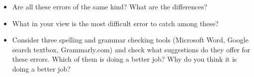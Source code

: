 \documentclass[11pt,a4paper]{article}
\begin{document}
\begin{itemize}
\item Are all these errors of the same kind? What are the differences? 
\item What in your view is the most difficult error to catch among these?
\item Consider three spelling and grammar checking tools (Microsoft Word, Google search textbox, Grammarly.com) and check what suggestions do they offer for these errors. Which of them is doing a better job? Why do you think it is doing a better job? 
\end{itemize}
\end{document}
